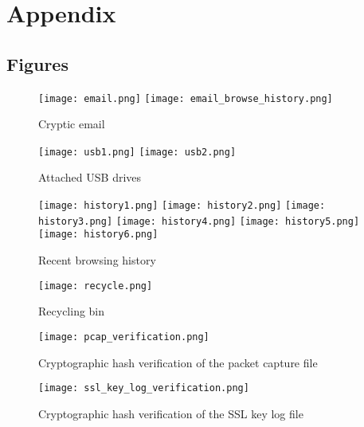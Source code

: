 \section{Appendix}
\subsection{Figures} %
\label{sec:Figures}

\begin{figure}[H]
    \centering
    \texttt{[image: email.png]}
    \texttt{[image: email\_browse\_history.png]}
    \caption{Cryptic email}
    \label{fig:email}
\end{figure}

\begin{figure}[H]
    \centering
    \texttt{[image: usb1.png]}
    \texttt{[image: usb2.png]}
    \caption{Attached USB drives}
    \label{fig:usb}
\end{figure}

\begin{figure}[H]
    \centering
    \texttt{[image: history1.png]}
    \texttt{[image: history2.png]}
    \texttt{[image: history3.png]}
    \texttt{[image: history4.png]}
    \texttt{[image: history5.png]}
    \texttt{[image: history6.png]}
    \caption{Recent browsing history}
    \label{fig:webhistory}
\end{figure}

\begin{figure}[H]
    \centering
    \texttt{[image: recycle.png]}
    \caption{Recycling bin}
    \label{recycle}
\end{figure}

\begin{figure}[H]
    \centering
    \texttt{[image: pcap\_verification.png]}
    \caption{Cryptographic hash verification of the packet capture file}
    \label{pcap_verification}
\end{figure}

\begin{figure}[H]
    \centering
    \texttt{[image: ssl\_key\_log\_verification.png]}
    \caption{Cryptographic hash verification of the SSL key log file}
    \label{ssl_key_log_verification}
\end{figure}

